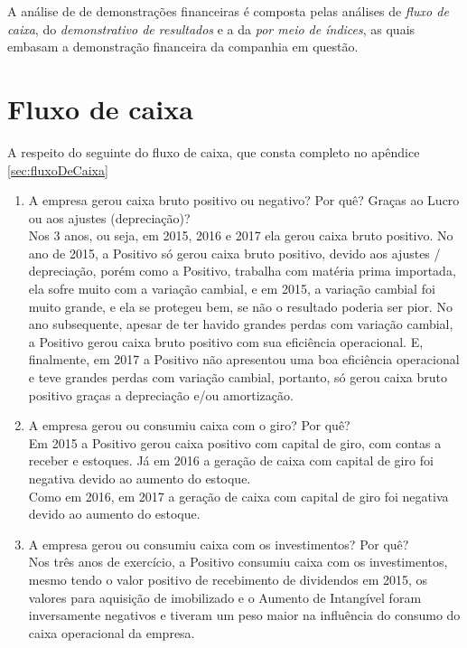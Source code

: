 \label{chap:financeiro}
A análise de de demonstrações financeiras é composta pelas análises de \emph{fluxo de caixa}, do \emph{demonstrativo de resultados} e a da \emph{por meio de índices}, as quais embasam a demonstração financeira da companhia em questão.

\section{Fluxo de caixa}

A respeito do seguinte do fluxo de caixa, que consta completo no apêndice \ref{sec:fluxoDeCaixa}

\begin{enumerate}
\item  A empresa gerou caixa bruto positivo ou negativo? Por quê? Graças ao Lucro ou aos ajustes (depreciação)?\\ Nos 3 anos, ou seja, em 2015, 2016 e 2017 ela gerou caixa bruto positivo. No ano de 2015, a Positivo só gerou caixa bruto positivo, devido aos ajustes / depreciação, porém como a Positivo, trabalha com matéria prima importada, ela sofre muito com a variação cambial, e em 2015, a variação cambial foi muito grande, e ela se protegeu bem, se não o resultado poderia ser pior. No ano subsequente, apesar de ter havido grandes perdas com variação cambial, a Positivo gerou caixa bruto positivo com sua eficiência operacional. E, finalmente, em 2017 a Positivo não apresentou uma boa eficiência operacional e teve grandes perdas com variação cambial, portanto, só gerou caixa bruto positivo graças a depreciação e/ou amortização.

\item A empresa gerou ou consumiu caixa com o giro? Por quê? \\ Em 2015 a Positivo gerou caixa positivo com capital de giro, com contas a receber e estoques. Já em 2016 a geração de caixa com capital de giro foi negativa devido ao aumento do estoque. \\ Como em 2016, em 2017 a geração de caixa com capital de giro foi negativa devido ao aumento do estoque.

\item A empresa gerou ou consumiu caixa com os investimentos? Por quê? \\ Nos três anos de exercício, a Positivo consumiu caixa com os investimentos, mesmo tendo o valor positivo de recebimento de dividendos em 2015, os valores para aquisição de imobilizado e o Aumento de Intangível foram inversamente negativos e tiveram um peso maior na influência do consumo do caixa operacional da empresa.


\end{enumerate}

